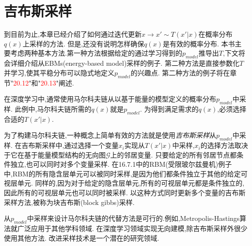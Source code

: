 \section{吉布斯采样}
\label{sec:17.4}

	到目前为止,本章已经介绍了如何通过迭代更新$x\rightarrow x' \sim T (x'|x) $在概率分布$q(x)$上采样的方法.
但是,还没有说明怎样确保$q(x)$是有效的概率分布.
本书主要考虑两种基本方法.第一种方法根据给定的通过学习得到的$p_{model}$推导出$T$,下文将会详细介绍从EBMs(energy-based model)采样的例子.
第二种方法是直接参数化$T$并学习,使其平稳分布可以隐式地定义$p_{model}$的兴趣点.
第二种方法的例子将在章节"\textcolor{red}{20.12}"和"\textcolor{red}{20.13}"阐述.

在深度学习中,通常使用马尔科夫链从以基于能量的模型定义的概率分布$p_{model}$中采样.
此例中,马尔科夫链所需的$q(x)$就是$p_{model}$.
为得到满足需求的$q(x)$,必须选择合适的$T(x'|x)$.

为了构建马尔科夫链,一种概念上简单有效的方法就是使用\textit{吉布斯采样}从$p_{model}$中采样.
在吉布斯采样中,通过选择一个变量$x_i$实现从$T(x'|x)$中采样,$x_i$的选择方法取决于它在基于能量模型结构的无向图$\mathcal{G}$上的邻居变量.
只要给定的所有邻居节点都条件独立,也可以同时对多个变量采样.
在16.7.1中的RBM(受限玻尔兹曼机)例子中,RBM的所有隐含层单元可以被同时采样,是因为他们都条件独立于其他的给定可视层单元.
同样的,因为对于给定的隐含层单元,所有的可视层单元都是条件独立的,因此所有的可视层单元也可以同时被采样.
以这种方式同时更新多个变量的吉布斯采样方法,被称为块吉布斯(block gibbs)采样.

从$p_{model}$中采样来设计马尔科夫链的代替方法是可行的.例如,Metropolis-Hastings算法就广泛应用于其他学科领域.
在深度学习领域实现无向建模,除吉布斯采样外很少使用其他方法.
改进采样技术是一个潜在的研究领域.